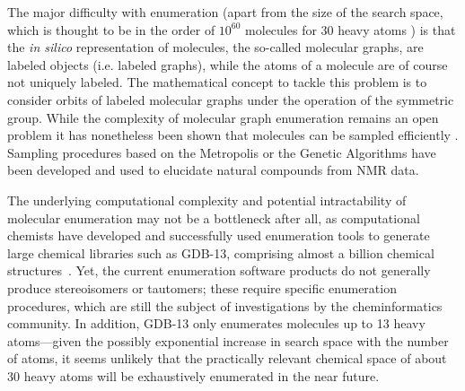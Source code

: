 \documentclass{sig-alternate}
\begin{document}
The major difficulty with enumeration (apart from the size of the
search space, which is thought to be in the order of $10^{60}$
molecules for 30 heavy atoms \cite{Bohacek:1996ve}) is that the
\emph{in silico} representation of molecules, the so-called molecular
graphs, are labeled objects (i.e. labeled graphs), while the atoms of
a molecule are of course not uniquely labeled. The mathematical
concept to tackle this problem is to consider orbits of labeled
molecular graphs under the operation of the symmetric group. While the
complexity of molecular graph enumeration remains an open problem it
has nonetheless been shown that molecules can be sampled
efficiently \cite{goldberg1999}. Sampling procedures based on the
Metropolis or the Genetic Algorithms have been developed and used to
elucidate natural compounds from NMR data.

The underlying computational complexity and potential intractability
of molecular enumeration may not be a bottleneck after all, as
computational chemists have developed and successfully used
enumeration tools to generate large chemical libraries such as GDB-13,
comprising almost a billion chemical structures~\cite{GDB}. Yet, the
current enumeration software products do not generally produce
stereoisomers or tautomers; these require specific enumeration
procedures, which are still the subject of investigations by the
cheminformatics community. In addition, GDB-13 only enumerates
molecules up to 13 heavy atoms---given the possibly exponential
increase in search space with the number of atoms, it seems unlikely
that the practically relevant chemical space of about 30 heavy atoms
will be exhaustively enumerated in the near future.
\end{document}
